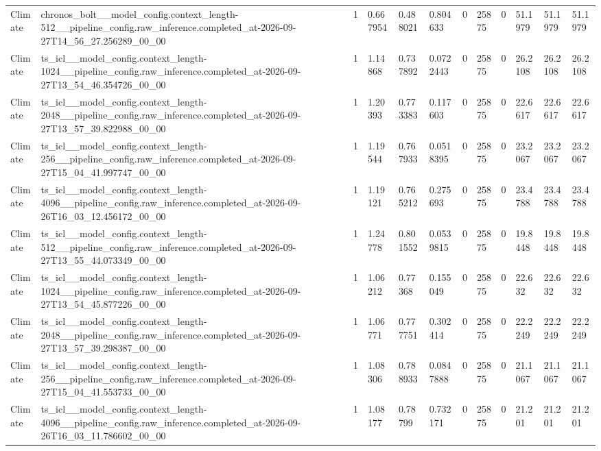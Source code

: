 \begin{tabular}{llllllllllll}
Climate & chronos\_bolt\_\_model\_config.context\_length-512\_\_pipeline\_config.raw\_inference.completed\_at-2026-09-27T14\_56\_27.256289\_00\_00 & 1 & 0.667954 & 0.488021 & 0.804633 & 0 & 25875 & 0 & 51.1979 & 51.1979 & 51.1979 \\
Climate & ts\_icl\_\_model\_config.context\_length-1024\_\_pipeline\_config.raw\_inference.completed\_at-2026-09-27T13\_54\_46.354726\_00\_00 & 1 & 1.14868 & 0.737892 & 0.0722443 & 0 & 25875 & 0 & 26.2108 & 26.2108 & 26.2108 \\
Climate & ts\_icl\_\_model\_config.context\_length-2048\_\_pipeline\_config.raw\_inference.completed\_at-2026-09-27T13\_57\_39.822988\_00\_00 & 1 & 1.20393 & 0.773383 & 0.117603 & 0 & 25875 & 0 & 22.6617 & 22.6617 & 22.6617 \\
Climate & ts\_icl\_\_model\_config.context\_length-256\_\_pipeline\_config.raw\_inference.completed\_at-2026-09-27T15\_04\_41.997747\_00\_00 & 1 & 1.19544 & 0.767933 & 0.0518395 & 0 & 25875 & 0 & 23.2067 & 23.2067 & 23.2067 \\
Climate & ts\_icl\_\_model\_config.context\_length-4096\_\_pipeline\_config.raw\_inference.completed\_at-2026-09-26T16\_03\_12.456172\_00\_00 & 1 & 1.19121 & 0.765212 & 0.275693 & 0 & 25875 & 0 & 23.4788 & 23.4788 & 23.4788 \\
Climate & ts\_icl\_\_model\_config.context\_length-512\_\_pipeline\_config.raw\_inference.completed\_at-2026-09-27T13\_55\_44.073349\_00\_00 & 1 & 1.24778 & 0.801552 & 0.0539815 & 0 & 25875 & 0 & 19.8448 & 19.8448 & 19.8448 \\
Climate & ts\_icl\_\_model\_config.context\_length-1024\_\_pipeline\_config.raw\_inference.completed\_at-2026-09-27T13\_54\_45.877226\_00\_00 & 1 & 1.06212 & 0.77368 & 0.155049 & 0 & 25875 & 0 & 22.632 & 22.632 & 22.632 \\
Climate & ts\_icl\_\_model\_config.context\_length-2048\_\_pipeline\_config.raw\_inference.completed\_at-2026-09-27T13\_57\_39.298387\_00\_00 & 1 & 1.06771 & 0.777751 & 0.302414 & 0 & 25875 & 0 & 22.2249 & 22.2249 & 22.2249 \\
Climate & ts\_icl\_\_model\_config.context\_length-256\_\_pipeline\_config.raw\_inference.completed\_at-2026-09-27T15\_04\_41.553733\_00\_00 & 1 & 1.08306 & 0.788933 & 0.0847888 & 0 & 25875 & 0 & 21.1067 & 21.1067 & 21.1067 \\
Climate & ts\_icl\_\_model\_config.context\_length-4096\_\_pipeline\_config.raw\_inference.completed\_at-2026-09-26T16\_03\_11.786602\_00\_00 & 1 & 1.08177 & 0.78799 & 0.732171 & 0 & 25875 & 0 & 21.201 & 21.201 & 21.201 \\

\end{tabular}
